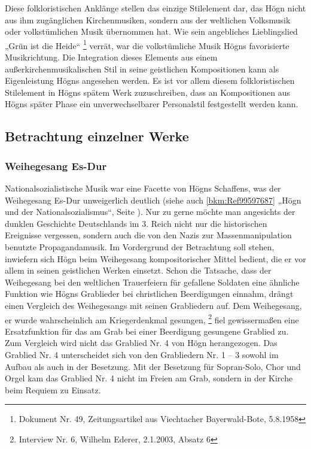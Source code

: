 \documentclass[a4paper]{article}
\begin{document}
Diese folkloristischen Anklänge stellen das einzige Stilelement dar, das
Högn nicht aus ihm zugänglichen Kirchenmusiken, sondern aus der
weltlichen Volksmusik oder volkstümlichen Musik übernommen hat. Wie
sein angebliches Lieblingslied „Grün ist die Heide“  \footnote{Dokument
Nr. 49, Zeitungsartikel aus Viechtacher Bayerwald-Bote, 5.8.1958}
verrät, war die volkstümliche Musik Högns favorisierte Musikrichtung.
Die Integration dieses Elements aus einem außerkirchenmusikalischen
Stil in seine geistlichen Kompositionen kann als Eigenleistung Högns
angesehen werden. Es ist vor allem diesem folkloristischen Stilelement
in Högns spätem Werk zuzuschreiben, dass an Kompositionen aus Högns
später Phase ein unverwechselbarer Personalstil festgestellt werden
kann.

\clearpage





\subsection{Betrachtung einzelner Werke}
\hypertarget{RefHeadingToc100333752}{}











\subsubsection{Weihegesang Es-Dur}
\label{bkm:Ref100062450}\hypertarget{RefHeadingToc100333753}{}\label{bkm:Ref100062461}\label{bkm:Ref100062456}Nationalsozialistische
Musik war eine Facette von Högns Schaffens, was der Weihegesang Es-Dur
unweigerlich deutlich (siehe auch \ref{bkm:Ref99597687} „Högn und der
Nationalsozialismus“, Seite \pageref{bkm:Ref99597697}). Nur zu gerne
möchte man angesichts der dunklen Geschichte Deutschlands im 3. Reich
nicht nur die historischen Ereignisse vergessen, sondern auch die von
den Nazis zur Massenmanipulation benutzte Propagandamusik. Im
Vordergrund der Betrachtung soll stehen, inwiefern sich Högn beim
Weihegesang kompositorischer Mittel bedient, die er vor allem in seinen
geistlichen Werken einsetzt. Schon die Tatsache, dass der Weihegesang
bei den weltlichen Trauerfeiern für gefallene Soldaten eine ähnliche
Funktion wie Högns Grablieder bei christlichen Beerdigungen einnahm,
drängt einen Vergleich des Weihegesangs mit seinen Grabliedern auf. Dem
Weihegesang, er wurde wahrscheinlich am Kriegerdenkmal
gesungen, \footnote{Interview Nr. 6, Wilhelm Ederer, 2.1.2003, Absatz
6} fiel gewissermaßen eine Ersatzfunktion für das am Grab bei einer
Beerdigung gesungene Grablied zu. Zum Vergleich wird nicht das Grablied
Nr. 4 von Högn herangezogen. Das Grablied Nr. 4 unterscheidet sich von
den Grabliedern Nr. 1 – 3 sowohl im Aufbau als auch in der Besetzung.
Mit der Besetzung für Sopran-Solo, Chor und Orgel kam das Grablied Nr.
4 nicht im Freien am Grab, sondern in der Kirche beim Requiem zu
Einsatz.
\end{document}

